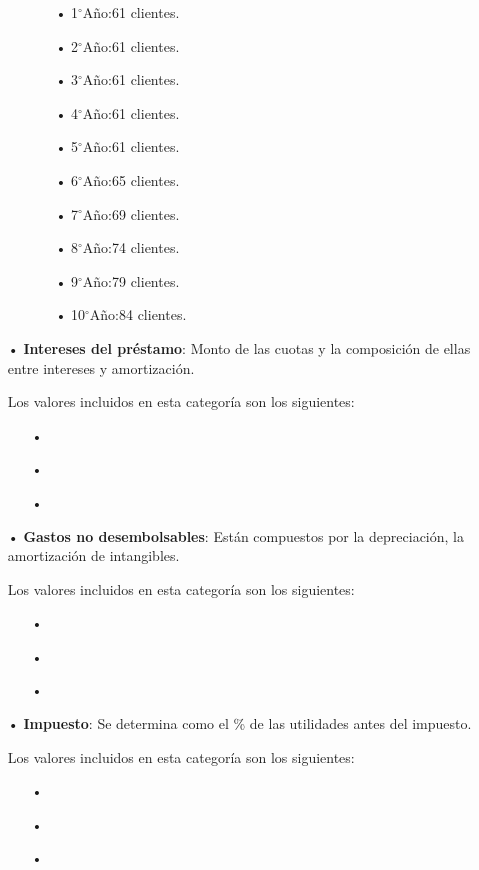 \begin{enumerate}
\begin{enumerate}
\begin{enumerate}
\item[•]1$^{\circ}$Año:61 clientes.
\item[•]2$^{\circ}$Año:61 clientes.
\item[•]3$^{\circ}$Año:61 clientes.
\item[•]4$^{\circ}$Año:61 clientes.
\item[•]5$^{\circ}$Año:61 clientes.
\item[•]6$^{\circ}$Año:65 clientes.
\item[•]7$^{\circ}$Año:69 clientes.
\item[•]8$^{\circ}$Año:74 clientes.
\item[•]9$^{\circ}$Año:79 clientes.
\item[•]10$^{\circ}$Año:84 clientes.
\end{enumerate}





\end{enumerate}



\item[•]\textbf{Intereses del préstamo}:
Monto de las cuotas y la composición de ellas entre intereses y amortización.

Los valores incluidos en esta categoría son los siguientes:
\begin{enumerate}
\item[•]
\item[•]
\item[•]
\end{enumerate}



\item[•]\textbf{Gastos no desembolsables}:
Están compuestos por la depreciación, la amortización de intangibles.

Los valores incluidos en esta categoría son los siguientes:
\begin{enumerate}
\item[•]
\item[•]
\item[•]
\end{enumerate}




\item[•]\textbf{Impuesto}:
Se determina como el \% de las utilidades antes del impuesto.

Los valores incluidos en esta categoría son los siguientes:
\begin{enumerate}
\item[•]
\item[•]
\item[•]
\end{enumerate}




\end{enumerate}
